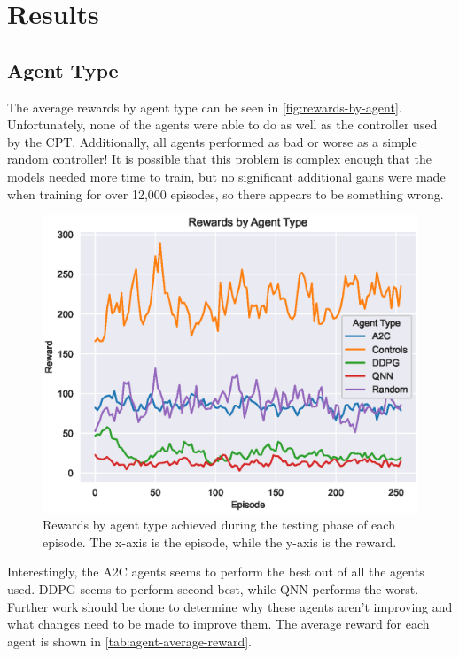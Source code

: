 \section{Results}\label{sec:results}

\subsection{Agent Type}\label{subsec:agent-type}
The average rewards by agent type can be seen in \autoref{fig:rewards-by-agent}.
Unfortunately, none of the agents were able to do as well as the controller used by the
CPT\@.
Additionally, all agents performed as bad or worse as a simple random controller!
It is possible that this problem is complex enough that the models needed more time
to train, but no significant additional gains were made when training for over 12,000
episodes, so there appears to be something wrong.

\begin{figure}[!ht]
    \centering
    \includegraphics[scale=0.5]
    {./figures/rewards-by-agent}
    \caption{
        Rewards by agent type achieved during the testing phase of each episode.
        The x-axis is the episode, while the y-axis is the reward.
    }
    \label{fig:rewards-by-agent}
\end{figure}

Interestingly, the A2C agents seems to perform the best out of all the agents used.
DDPG seems to perform second best, while QNN performs the worst.
Further work should be done to determine why these agents aren't improving and what
changes need to be made to improve them.
The average reward for each agent is shown in \autoref{tab:agent-average-reward}.

